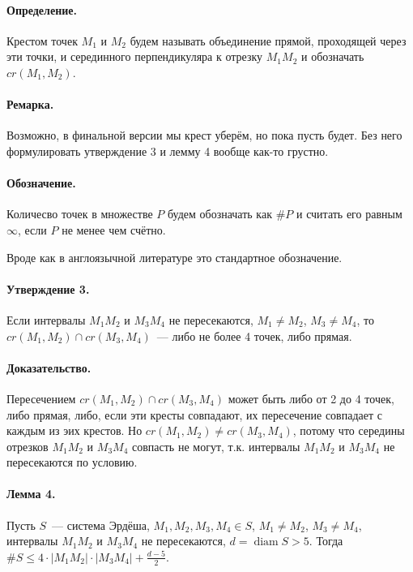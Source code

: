 \documentclass[a4paper,14pt]{article} %
\begin{document}
\paragraph{Определение.}
Крестом точек $M_1$ и $M_2$ будем называть объединение прямой,
проходящей через эти точки,
и серединного перпендикуляра к отрезку $M_1 M_2$
и обозначать $cr(M_1,M_2)$.

\paragraph{Ремарка.}
Возможно, в финальной версии мы крест уберём, но пока пусть будет.
Без него формулировать утверждение 3 и лемму 4 вообще как-то грустно.

\paragraph{Обозначение.}
Количесво точек в множестве $P$ будем обозначать как $\#P$
и считать его равным $\infty$, если $P$ не менее чем счётно.

Вроде как в англоязычной литературе это стандартное обозначение.

\paragraph{Утверждение 3.}
Если интервалы $M_1 M_2$ и $M_3 M_4$ не пересекаются,
$M_1 \neq M_2$, $M_3 \neq M_4$,
то $cr(M_1,M_2) \cap cr(M_3,M_4)$~--- либо не более 4 точек, либо прямая.

\paragraph{Доказательство.}
Пересечением $cr(M_1,M_2) \cap cr(M_3,M_4)$ может быть либо от 2 до 4 точек, либо прямая,
либо, если эти кресты совпадают, их пересечение совпадает с каждым из эих крестов.
Но $cr(M_1,M_2) \neq cr(M_3,M_4)$, потому что середины отрезков $M_1 M_2$ и $M_3 M_4$
совпасть не могут, т.к. интервалы $M_1 M_2$ и $M_3 M_4$ не пересекаются по условию.

\paragraph{Лемма 4.}
Пусть $S$~--- система Эрдёша,
$M_1, M_2, M_3, M_4 \in S$,
$M_1 \neq M_2$, $M_3 \neq M_4$,
интервалы $M_1 M_2$ и $M_3 M_4$ не пересекаются,
$d = \mathop{diam} S > 5$.
Тогда $\#S \leq 4 \cdot |M_1 M_2| \cdot |M_3 M_4| + \frac{d-5}{2}$.
\end{document}
